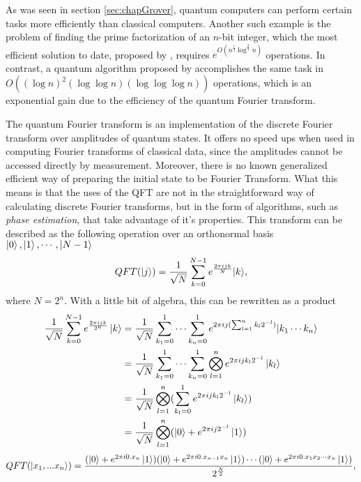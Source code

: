 \documentclass[../../dissertation.tex]{subfiles}
\begin{document}
As was seen in section \ref{sec:chapGrover}, quantum computers can perform certain tasks more efficiently than classical computers. Another such example is the problem of finding the prime factorization of an $n$-bit integer, which the most efficient solution to date, proposed by \cite{Pollard93}, requires $e^{O(n^{\frac{1}{3}}\log^{\frac{2}{3}}n)}$ operations. In contrast, a quantum algorithm proposed by \cite{Shor94} accomplishes the same task in $O((\log n)^2 (\log \log n) (\log \log \log n))$ operations, which is an exponential gain due to the efficiency of the quantum Fourier transform.\par
The quantum Fourier transform is an implementation of the discrete Fourier transform over amplitudes of quantum states. It offers no speed ups when used in computing Fourier transforms of classical data, since the amplitudes cannot be accessed directly by measurement. Moreover, there is no known generalized efficient way of preparing the initial state to be Fourier Transform. What this means is that the uses of the QFT are not in the straightforward way of calculating discrete Fourier transforms, but in the form of algorithms, such as \textit{phase estimation}, that take advantage of it's properties. This transform can be described as the following operation over an orthonormal basis $\ket{0}, \ket{1},\cdots,\ket{N-1}$
\begin{equation}
	QFT(\ket{j}) = \frac{1}{\sqrt{N}} \sum_{k=0}^{N-1} e^{\frac{2\pi i j k}{N}} {\ket{k}},
\end{equation}
where $N = 2^n$. With a little bit of algebra, this can be rewritten as a product
\begin{equation}
	\begin{split}
		\frac{1}{\sqrt{N}} \sum_{k=0}^{N-1} e^{\frac{2\pi i j k}{2^n}} \ket{k} & = 
	\frac{1}{\sqrt{N}} \sum_{k_1=0}^1 \cdots \sum_{k_n=0}^{1} e^{2\pi i j (\sum_{l=1}^{n} k_l 2^{-l})} {\ket{k_1\cdots k_n}}  \\
																 &= \frac{1}{\sqrt{N}} \sum_{k_1=0}^1 \cdots \sum_{k_n=0}^{1} \bigotimes_{l=1}^n e^{2\pi i j k_l 2^{-l} } \ket{k_l} \\
																 &= \frac{1}{\sqrt{N}} \bigotimes_{l=1}^{n}( \sum_{k_l=0}^{1}  e^{2\pi i j k_l 2^{-l} } \ket{k_l} ) \\
																 &= \frac{1}{\sqrt{N}} \bigotimes_{l=1}^{n}( \ket{0} +  e^{2\pi i j 2^{-l} } \ket{1} )
	\end{split}
\end{equation}
\begin{equation} \label{eq:QFTCircuitRep} 
	QFT(\ket{x_1,...x_n})  =\frac{(\ket{0} + e^{2 \pi i 0.x_n} \ket{1}) (\ket{0} + e^{2 \pi i 0.x_{n-1}x_n} \ket{1})\cdots  (\ket{0} + e^{2 \pi i 0.x_1x_2\cdots x_n} \ket{1})}{2^{\frac{N}{2}}},
\end{equation}
\end{document}
